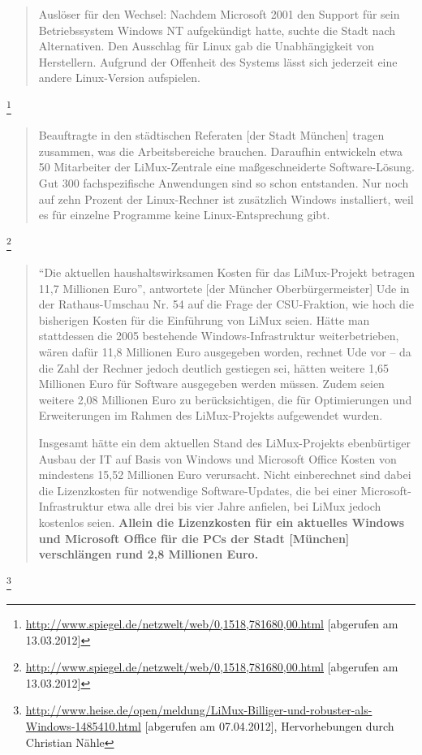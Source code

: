 \documentclass[a4paper]{scrartcl}
\begin{document}
\begin{quote}Auslöser für den Wechsel: Nachdem Microsoft 2001 den Support für
  sein Betriebssystem Windows NT aufgekündigt hatte, suchte die Stadt nach
  Alternativen. Den Ausschlag für Linux gab die Unabhängigkeit von
  Herstellern. Aufgrund der Offenheit des Systems lässt sich jederzeit eine
  andere Linux-Version aufspielen.
\end{quote}\footnote{\url{http://www.spiegel.de/netzwelt/web/0,1518,781680,00.html}
[abgerufen am 13.03.2012]}

\begin{quote}Beauftragte in den städtischen Referaten [der Stadt München] tragen
  zusammen, was die Arbeitsbereiche brauchen. Daraufhin entwickeln etwa 50
  Mitarbeiter der LiMux-Zentrale eine maßgeschneiderte Software-Lösung. Gut 300
  fachspezifische Anwendungen sind so schon entstanden. Nur noch auf zehn
  Prozent der Linux-Rechner ist zusätzlich Windows installiert, weil es für
  einzelne Programme keine Linux-Entsprechung gibt.
\end{quote}\footnote{\url{http://www.spiegel.de/netzwelt/web/0,1518,781680,00.html}
[abgerufen am 13.03.2012]}

\begin{quote}``Die aktuellen haushaltswirksamen Kosten
für das LiMux-Projekt betragen 11,7 Millionen
Euro'', antwortete [der Müncher Oberbürgermeister]
Ude in der Rathaus-Umschau Nr. 54 auf die Frage der CSU-Fraktion, wie
hoch die bisherigen Kosten für die Einführung von LiMux seien.
Hätte man stattdessen die 2005 bestehende Windows-Infrastruktur
weiterbetrieben, wären dafür 11,8 Millionen Euro ausgegeben worden,
rechnet Ude vor -- da die Zahl der Rechner jedoch deutlich gestiegen
sei, hätten weitere 1,65 Millionen Euro für Software ausgegeben
werden müssen. Zudem seien weitere 2,08 Millionen Euro zu
berücksichtigen, die für Optimierungen und Erweiterungen im Rahmen
des LiMux-Projekts aufgewendet wurden.

Insgesamt hätte ein dem aktuellen Stand des LiMux-Projekts ebenbürtiger Ausbau
der IT auf Basis von Windows und Microsoft Office Kosten von mindestens 15,52
Millionen Euro verursacht. Nicht einberechnet sind dabei die Lizenzkosten für
notwendige Software-Updates, die bei einer Microsoft-Infrastruktur etwa alle
drei bis vier Jahre anfielen, bei LiMux jedoch kostenlos seien.  \textbf{Allein
  die Lizenzkosten für ein aktuelles Windows und Microsoft Office für die PCs
  der Stadt [München] verschlängen rund 2,8 Millionen Euro.}
\end{quote}\footnote{\url{http://www.heise.de/open/meldung/LiMux-Billiger-und-robuster-als-Windows-1485410.html}
  [abgerufen am 07.04.2012], Hervorhebungen durch Christian Nähle}
\end{document}
